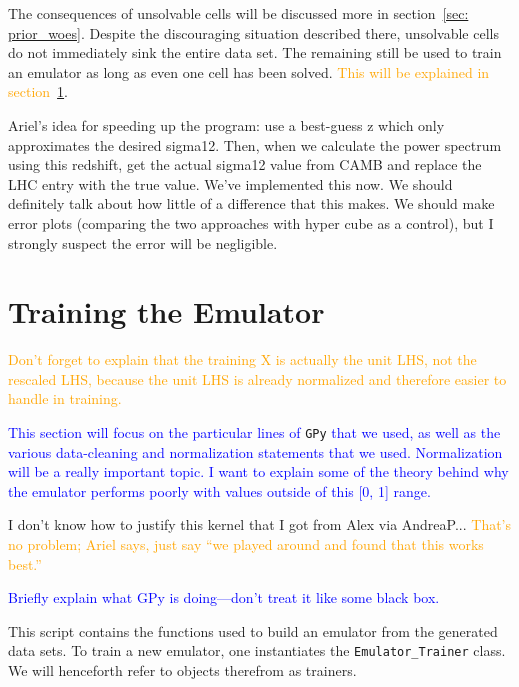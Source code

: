 
The consequences of unsolvable cells will be discussed more in
section~\ref{sec: prior_woes}. Despite the discouraging situation described 
there,
unsolvable cells do not immediately sink the entire data set. The remaining
still be used to train an emulator as long as even one cell has been solved.
\textcolor{orange}{This will be explained in section~\ref{sec: train_emu}}.


Ariel’s idea for speeding up the program: use a best-guess z which only approximates the desired sigma12. Then, when we calculate the power spectrum using this redshift, get the actual sigma12 value from CAMB and replace the LHC entry with the true value.
We’ve implemented this now. We should definitely talk about how little of a difference that this makes. We should make error plots (comparing the two approaches with hyper cube as a control), but I strongly suspect the error will be negligible.


\section{Training the Emulator}
\label{sec: train_emu}

\textcolor{orange}{Don't forget to explain that the training X is actually the
unit LHS, not the rescaled LHS, because the unit LHS is already normalized
and therefore easier to handle in training.}


\textcolor{blue}{This section will focus on the particular lines of}
\verb|GPy| \textcolor{blue}{that we used, as well
as the various data-cleaning and normalization statements that we used.
Normalization will be a really important topic. I want to explain some of
the theory behind why the emulator performs poorly with values outside of this
[0, 1] range.}

I don't know how to justify this kernel that I got from Alex via AndreaP...
\textcolor{orange}{That's no problem; Ariel says, just say ``we played around
and found that this works best.''}

\textcolor{blue}{Briefly explain what GPy is doing—don’t treat it like some black box.}

This script contains the functions used to build an emulator from the 
generated data sets. To train a new emulator, one instantiates the
\verb|Emulator_Trainer| class. We will henceforth refer to objects therefrom 
as trainers.

